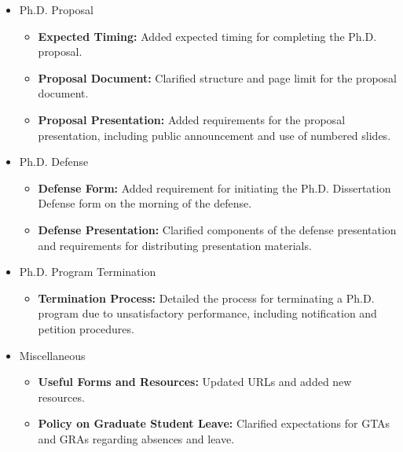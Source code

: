 \begin{itemize}[nosep]
  \item Ph.D. Proposal
\begin{itemize}[nosep]
  \item \textbf{Expected Timing:} Added expected timing for completing the Ph.D. proposal.
  \item \textbf{Proposal Document:} Clarified structure and page limit for the proposal document.
  \item \textbf{Proposal Presentation:} Added requirements for the proposal presentation, including public announcement and use of numbered slides.
\end{itemize}
\end{itemize}

\begin{itemize}[nosep]
  \item Ph.D. Defense
\begin{itemize}[nosep]
  \item \textbf{Defense Form:} Added requirement for initiating the Ph.D. Dissertation Defense form on the morning of the defense.
  \item \textbf{Defense Presentation:} Clarified components of the defense presentation and requirements for distributing presentation materials.
\end{itemize}
\end{itemize}

\begin{itemize}[nosep]
  \item Ph.D. Program Termination
\begin{itemize}[nosep]
  \item \textbf{Termination Process:} Detailed the process for terminating a Ph.D. program due to unsatisfactory performance, including notification and petition procedures.
\end{itemize}
\end{itemize}

\begin{itemize}[nosep]
  \item Miscellaneous
\begin{itemize}[nosep]
  \item \textbf{Useful Forms and Resources:} Updated URLs and added new resources.
  \item \textbf{Policy on Graduate Student Leave:} Clarified expectations for GTAs and GRAs regarding absences and leave.
\end{itemize}
\end{itemize}

